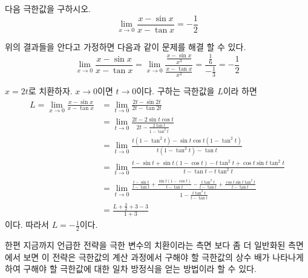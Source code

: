 \documentclass[11pt, a4paper]{book}
\begin{document}
\begin{example}
	 다음 극한값을 구하시오.
	\begin{equation*}
	\displaystyle\lim_{x\to 0}\frac{x-\sin x}{x-\tan x}= -\frac{1}{2}
	\end{equation*}
\begin{solution}
	 위의 결과들을 안다고 가정하면 다음과 같이 문제를 해결 할 수 있다.
\begin{equation*}
	\displaystyle\lim_{x\to 0}\frac{x-\sin x}{x-\tan x}=\displaystyle\lim_{x\to 0}\frac{\frac{x-\sin x}{x^{3}}}{\frac{x-\tan x}{x^{3}}}=\frac{\frac{1}{6}}{-\frac{1}{3}}= -\frac{1}{2}
\end{equation*}	

\end{solution}
\begin{solution}
 $x = 2t$로 치환하자. $x\to 0$이면 $t\to 0$이다. 구하는 극한값을 $L$이라 하면
	\begin{align*}
		L=\displaystyle\lim_{x\to 0}\frac{x-\sin x}{x-\tan x}
		& =\displaystyle\lim_{t\to 0}\frac{2t -\sin 2t}{2t -\tan 2t}\\
		& =\displaystyle\lim_{t\to 0}\frac{2t - 2\sin t\cos t}{2t -\frac{2\tan t}{1-\tan^{2}t}}\\
		& =\displaystyle\lim_{t\to 0}\frac{t(1-\tan^{2}t)-\sin t\cos t(1-\tan^{2}t)}{t(1-\tan^{2}t)-\tan t}\\
		& =\displaystyle\lim_{t\to 0}\frac{t-\sin t +\sin t(1-\cos t)- t\tan^{2}t +\cos t\sin t\tan^{2}t}{t -\tan t - t\tan^{2}t}\\
		& =\displaystyle\lim_{t\to 0}\frac{\frac{t-\sin t}{t -\tan t}+\frac{\sin t(1-\cos t)}{t-\tan t}-\frac{t\tan^{2}t}{t -\tan t}+\frac{\cos t\sin t\tan^{2}t}{t-\tan t}}{1 -\frac{t\tan^{2}t}{t -\tan t}}\\
		& =\frac{L +\frac{3}{2}+3 - 3}{1+3}
	\end{align*} 
	이다. 따라서 $L =-\frac{1}{2}$이다.
\end{solution}
\end{example}
\vspace{1em}
	
	한편 지금까지 언급한 전략을 극한 변수의 치환이라는 측면 보다 좀 더 일반화된 측면에서 보면 이 전략은 극한값의 계산 과정에서 구해야 할 극한값의 상수 배가 나타나게 하여 구해야 할 극한값에 대한 일차 방정식을 얻는 방법이라 할 수 있다. 
	
\end{document}
